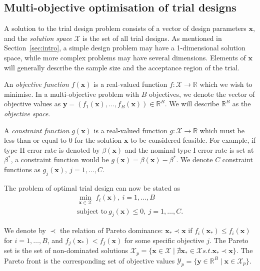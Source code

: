 \documentclass{article} %
\begin{document}

\subsection{Multi-objective optimisation of trial designs}

A solution to the trial design problem consists of a vector of design parameters $\mathbf{x}$, and the \emph{solution space} $\mathcal{X}$ is the set of all trial designs. As mentioned in Section~\ref{sec:intro}, a simple design problem may have a 1-dimensional solution space, while more complex problems may have several dimensions. Elements of $\mathbf{x}$ will generally describe the sample size and the acceptance region of the trial.

An \emph{objective function} $f(\mathbf{x})$ is a real-valued function $f : \mathcal{X} \rightarrow \mathbb{R}$ which we wish to minimise. In a multi-objective problem with $B$ objectives, we denote the vector of objective values as $\mathbf{y} = (f_{1}(\mathbf{x}), \ldots, f_{B}(\mathbf{x})) \in \mathbb{R}^{B}$. We will describe $\mathbb{R}^{B}$ as the \emph{objective space}.

A \emph{constraint function} $g(\mathbf{x})$ is a real-valued function $g : \mathcal{X} \rightarrow \mathbb{R}$ which must be less than or equal to 0 for the solution $\mathbf{x}$ to be considered feasible. For example, if type II error rate is denoted by $\beta(\mathbf{x})$ and the nominal type I error rate is set at $\beta^{*}$, a constraint function would be $g(\mathbf{x}) = \beta(\mathbf{x}) - \beta^{*}$. We denote $C$ constraint functions as $g_{j}(\mathbf{x}),~j=1,\ldots , C$.

The problem of optimal trial design can now be stated as
\begin{align}
\min_{\mathbf{x} \in \mathcal{X}} {~ f_{i}(\mathbf{x})}, ~ i = 1, \ldots , B \\
\text{subject to} ~ g_{j}(\mathbf{x}) \leq 0, ~ j = 1, \ldots , C.
\end{align}

We denote by $\prec$ the relation of Pareto dominance: 
$\mathbf{x}_{*} \prec \mathbf{x}$ if $f_{i}(\mathbf{x}_{*}) \leq f_{i}(\mathbf{x})$ for $i = 1, \ldots , B$, and $f_{j}(\mathbf{x}_{*}) < f_{j}(\mathbf{x})$ for some specific objective $j$. The Pareto set is the set of non-dominated solutions 
$\mathcal{X}_{p} = \{\mathbf{x} \in \mathcal{X} \mid \nexists \mathbf{x}_{*}  \in \mathcal{X} s.t. \mathbf{x}_{*} \prec \mathbf{x} \}$. 
The Pareto front is the corresponding set of objective values 
$\mathcal{Y}_{p} = \{ \mathbf{y} \in \mathbb{R}^{B} \mid \mathbf{x} \in \mathcal{X}_{p} \}$.
\end{document}
